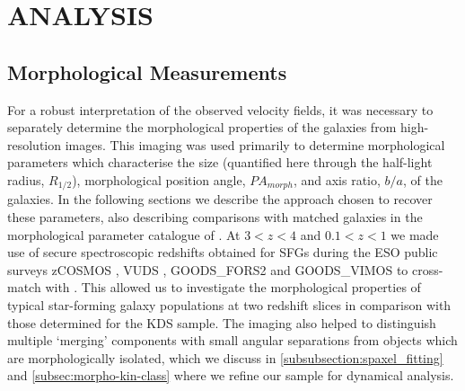 \documentclass[fleqn,usenatbib]{mnras}
\begin{document}
\section{ANALYSIS}\label{sec:analysis}


\subsection{Morphological Measurements}\label{subsec:morphological_measurements}
For a robust interpretation of the observed velocity fields, it was necessary to separately determine the morphological properties of the galaxies from high-resolution images.
This imaging was used primarily to determine morphological parameters which characterise the size (quantified here through the half-light radius, $R_{1/2}$), morphological position angle, $PA_{morph}$, and axis ratio, $b/a$, of the galaxies. 
In the following sections we describe the approach chosen to recover these parameters, also describing comparisons with matched galaxies in the morphological parameter catalogue of \cite{VanderWel2012}.
At $3 < z < 4$ and $0.1 < z < 1$ we made use of secure spectroscopic redshifts obtained for SFGs during the ESO public surveys zCOSMOS \citep{Lilly2007}, VUDS \citep{Tasca2016}, GOODS\_FORS2 \citep{Vanzella2005,Vanzella2006,Vanzella2008} and GOODS\_VIMOS \citep{Balestra2010} to cross-match with \cite{VanderWel2012}.
This allowed us to investigate the morphological properties of typical star-forming galaxy populations at two redshift slices in comparison with those determined for the KDS sample.
The imaging also helped to distinguish multiple `merging' components with small angular separations from objects which are morphologically isolated, which we discuss in \cref{subsubsection:spaxel_fitting} and \cref{subsec:morpho-kin-class} where we refine our sample for dynamical analysis.
\end{document}
